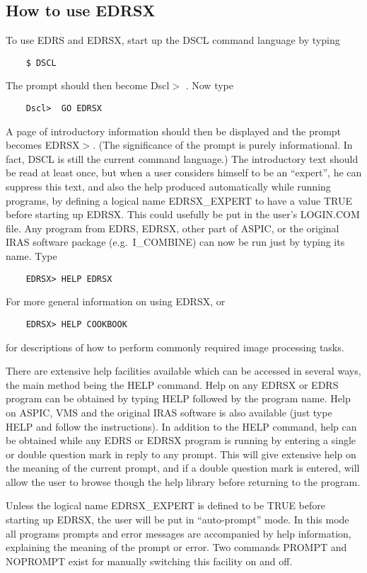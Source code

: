 \subsection {How to use EDRSX}
To use EDRS and EDRSX, start up the DSCL command language by typing
\begin{verbatim}
    $ DSCL
\end{verbatim}
The prompt should then become Dscl$>$ . Now type
\begin{verbatim}
    Dscl>  GO EDRSX
\end{verbatim}
A page of introductory information should then be displayed and the prompt
becomes EDRSX$>$.
(The significance of the prompt is purely informational.
In fact, DSCL is still the current command language.)
The introductory text should be read at least once, but when a user considers
himself to be an ``expert'', he can suppress this text, and also the help
produced automatically while running programs, by defining a logical name
EDRSX\_EXPERT to have a value TRUE before starting up EDRSX.
This could usefully be put in the user's LOGIN.COM file.
Any program from EDRS, EDRSX, other part of ASPIC, or the original IRAS software
package (e.g.\ I\_COMBINE) can now be run just by typing its name.
Type
\begin{verbatim}
    EDRSX> HELP EDRSX
\end{verbatim}
For more general information on using EDRSX, or
\begin{verbatim}
    EDRSX> HELP COOKBOOK
\end{verbatim}
for descriptions of how to perform commonly required image processing tasks.

There are extensive help facilities available which can be accessed in several
ways, the main method being the HELP command.
Help on any EDRSX or EDRS program can be obtained by typing HELP followed by the
program name.
Help on ASPIC, VMS and the original IRAS software is also available (just type
HELP and follow the instructions).
In addition to the HELP command, help can be obtained while any EDRS or EDRSX
program is running by entering a single or double question mark in reply to
any prompt.
This will give extensive help on the meaning of the current prompt, and if a
double question mark is entered, will allow the user to browse though the help
library before returning to the program.

Unless the logical name EDRSX\_EXPERT is defined to be TRUE before starting up
EDRSX, the user will be put in ``auto-prompt'' mode.
In this mode all programs prompts and error messages are accompanied by help
information, explaining the meaning of the prompt or error.
Two commands PROMPT and NOPROMPT exist for manually switching this facility
on and off.
